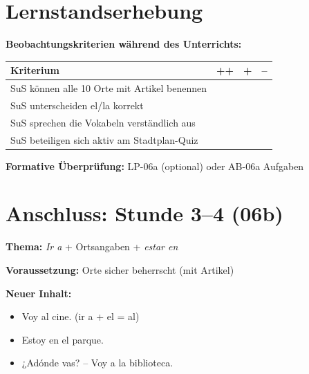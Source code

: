 \documentclass[11pt,a4paper]{article}
\begin{document}
\vspace{1em}

\section*{Lernstandserhebung}

\textbf{Beobachtungskriterien während des Unterrichts:}

\begin{tabularx}{\textwidth}{|X|c|c|c|}
\hline
\textbf{Kriterium} & \textbf{++} & \textbf{+} & \textbf{--} \\
\hline
SuS können alle 10 Orte mit Artikel benennen & & & \\
\hline
SuS unterscheiden el/la korrekt & & & \\
\hline
SuS sprechen die Vokabeln verständlich aus & & & \\
\hline
SuS beteiligen sich aktiv am Stadtplan-Quiz & & & \\
\hline
\end{tabularx}

\vspace{0.5em}

\textbf{Formative Überprüfung:} LP-06a (optional) oder AB-06a Aufgaben

\vspace{1em}

\section*{Anschluss: Stunde 3--4 (06b)}

\textbf{Thema:} \textit{Ir a} + Ortsangaben + \textit{estar en}

\textbf{Voraussetzung:} Orte sicher beherrscht (mit Artikel)

\textbf{Neuer Inhalt:}
\begin{itemize}[nosep]
    \item Voy al cine. (ir a + el = al)
    \item Estoy en el parque.
    \item ¿Adónde vas? -- Voy a la biblioteca.
\end{itemize}
\end{document}
